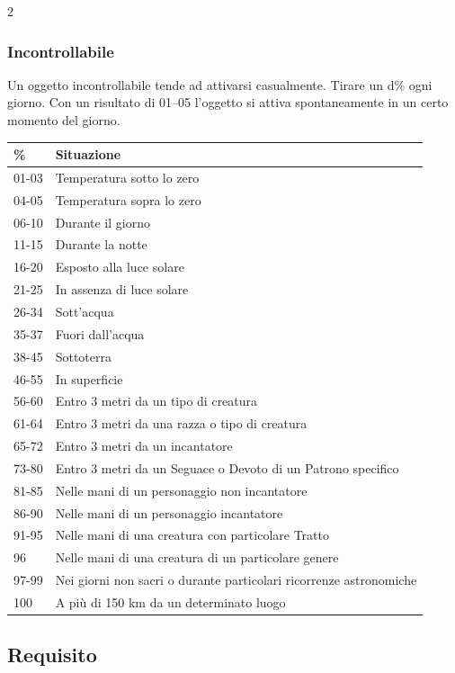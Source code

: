 \begin{multicols}{2}
\subsubsection{Incontrollabile}

Un oggetto incontrollabile tende ad attivarsi casualmente. Tirare un d\% ogni giorno. Con un risultato di 01--05 l'oggetto si attiva spontaneamente in un certo momento del giorno.

\medskip

\noindent\begin{tabularx}{\linewidth}{lX}
	\toprule
\rowcolor{gray!20}\textbf{\%} & \textbf{Situazione}\\
\toprule
01-03 & Temperatura sotto lo zero\\
\rowcolor{gray!20}04-05 & Temperatura sopra lo zero\\
06-10 & Durante il giorno\\
\rowcolor{gray!20}11-15 & Durante la notte\\
16-20 & Esposto alla luce solare\\
\rowcolor{gray!20}21-25 & In assenza di luce solare\\
26-34 & Sott'acqua\\
\rowcolor{gray!20}35-37 & Fuori dall'acqua\\
38-45 & Sottoterra\\
\rowcolor{gray!20}46-55 & In superficie\\
56-60 & Entro 3 metri da un tipo di creatura\\
\rowcolor{gray!20}61-64 & Entro 3 metri da una razza o tipo di creatura\\
65-72 & Entro 3 metri da un incantatore\\
\rowcolor{gray!20}73-80 & Entro 3 metri da un Seguace o Devoto di un Patrono specifico\\
81-85 & Nelle mani di un personaggio non incantatore\\
\rowcolor{gray!20}86-90 & Nelle mani di un personaggio incantatore\\
91-95 & Nelle mani di una creatura con particolare Tratto\\
\rowcolor{gray!20}96& Nelle mani di una creatura di un particolare genere\\
97-99 & Nei giorni non sacri o durante particolari ricorrenze astronomiche\\
\rowcolor{gray!20}100 & A più di 150 km da un determinato luogo
\end{tabularx}

\subsection{Requisito}


\end{multicols}

